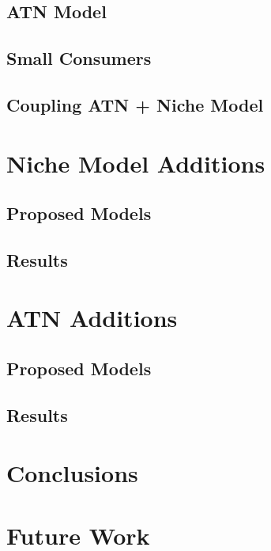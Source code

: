 \documentclass{beamer}
\begin{document}
\subsection{ATN Model}

\subsection{Small Consumers}

\subsection{Coupling ATN + Niche Model}

\section{Niche Model Additions}

\subsection{Proposed Models}

\subsection{Results}

\section{ATN Additions}

\subsection{Proposed Models}

\subsection{Results}

\section{Conclusions}

\section{Future Work}
\end{document}
